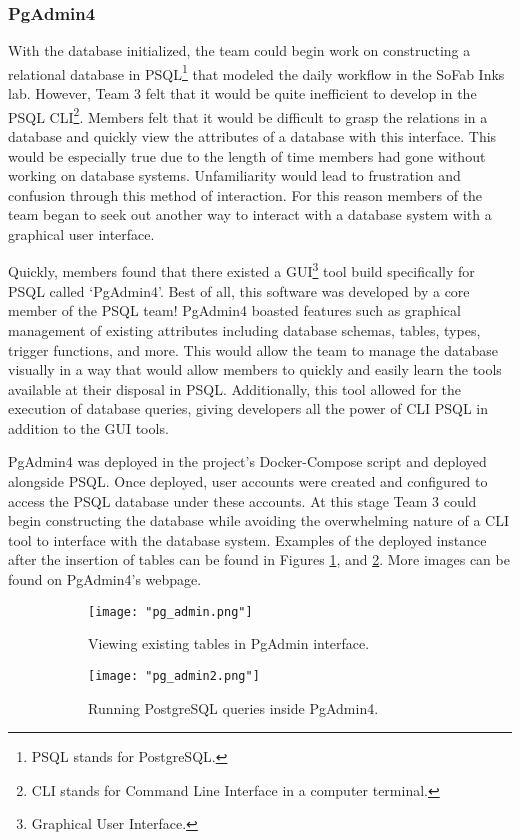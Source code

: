 \documentclass{article}
\begin{document}
\subsubsection{PgAdmin4}
With the database initialized, the team could begin work on constructing a relational database in PSQL\footnote{PSQL stands for PostgreSQL.}
that modeled the daily workflow in the SoFab Inks lab. However, Team 3 felt that it would be quite inefficient to develop in the 
PSQL CLI\footnote{CLI stands for Command Line Interface in a computer terminal.}. Members felt that it would be difficult to grasp the 
relations in a database and quickly view the attributes of a database with this interface. This would be especially true due to the 
length of time members
had gone without working on database systems. Unfamiliarity would lead to frustration and confusion through this method of interaction. 
For this reason members of the team began to seek out another way to interact with a database system with a graphical user interface. 

Quickly, members found that there existed a GUI\footnote{Graphical User Interface.} tool build specifically for PSQL called `PgAdmin4'. 
Best of all, this software was developed by a core member of the PSQL team! PgAdmin4 boasted features such as graphical management of 
existing attributes including database schemas, tables, types, trigger functions, and more. This would allow the team to manage the 
database visually in a way that would allow members to quickly and easily learn the tools available at their disposal in PSQL. Additionally,
this tool allowed for the execution of database queries, giving developers all the power of CLI PSQL in addition to the GUI tools. 

PgAdmin4 was deployed in the project's Docker-Compose script and deployed alongside PSQL. Once deployed, user accounts were created and 
configured to access the PSQL database under these accounts. At this stage Team 3 could begin constructing the database while avoiding
the overwhelming nature of a CLI tool to interface with the database system. Examples of the deployed instance after the insertion of 
tables can be found in Figures \ref{fig:pg_admin_tables}, and \ref{fig:pg_admin_queries}. More images can be found on PgAdmin4's webpage.
\cite{pgadmin-screenshots}

\begin{figure}[h!]
    \centering
    \begin{subfigure}[b]{.45\textwidth}
        \centering
        \texttt{[image: "pg\_admin.png"]}
        \caption{Viewing existing tables in PgAdmin interface.}
        \label{fig:pg_admin_tables}
    \end{subfigure}
    \begin{subfigure}[b]{.45\textwidth}
        \centering
        \texttt{[image: "pg\_admin2.png"]}
        \caption{Running PostgreSQL queries inside PgAdmin4.}
        \label{fig:pg_admin_queries}
    \end{subfigure}
    \caption{}
    \label{fig:pg_admin_figs}
\end{figure}
\FloatBarrier
\end{document}
